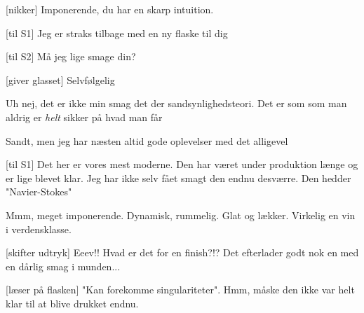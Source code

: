 \documentclass[a4paper,11pt]{article}
\begin{document}
\begin{sketch}
[nikker] Imponerende, du har en skarp intuition.

[til S1] Jeg er straks tilbage med en ny flaske til dig


[til S2] Må jeg lige smage din?

[giver glasset] Selvfølgelig

 Uh nej, det er ikke min smag det der sandsynlighedsteori. Det er som som man aldrig er \textit{helt} sikker på hvad man får

 Sandt, men jeg har næsten altid gode oplevelser med det alligevel


[til S1] Det her er vores mest moderne. Den har været under produktion længe og er lige blevet klar. Jeg har ikke selv fået smagt den endnu desværre. Den hedder "Navier-Stokes"


 Mmm, meget imponerende. Dynamisk, rummelig. Glat og lækker. Virkelig en vin i verdensklasse.

[skifter udtryk] Eeev!! Hvad er det for en finish?!? Det efterlader godt nok en med en dårlig smag i munden...

[læser på flasken] "Kan forekomme singulariteter". Hmm, måske den ikke var helt klar til at blive drukket endnu.



\end{sketch}
\end{document}
